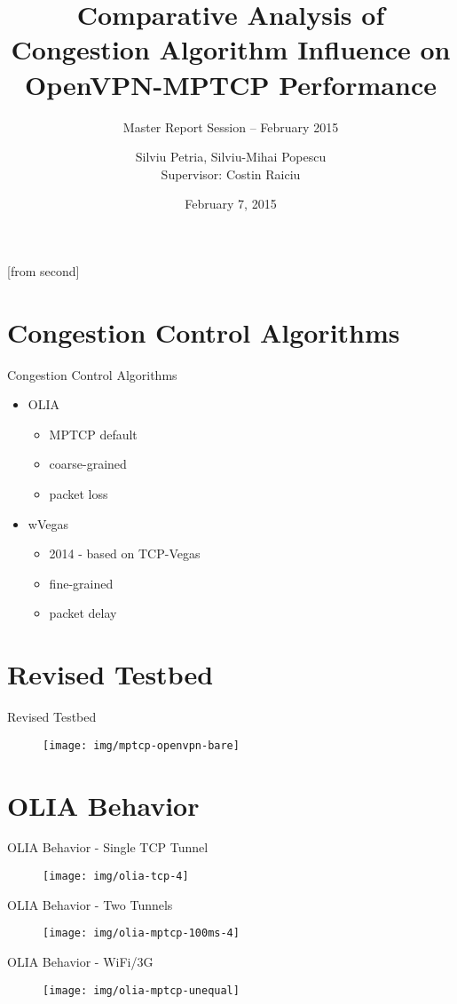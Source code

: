 \documentclass{beamer}
\title[Comparative Analysis of Congestion Algorithm
Influence on OpenVPN-MPTCP Performance]{Comparative Analysis of Congestion
Algorithm Influence on OpenVPN-MPTCP Performance}
\subtitle{Master Report Session -- February 2015}
\institute{Faculty of Automatic Control and Computers,\\
	University POLITEHNICA of Bucharest}
\author[Silviu Petria, Silviu-Mihai Popescu]{Silviu Petria, Silviu-Mihai
Popescu\\
	Supervisor: Costin Raiciu}
\date{February 7, 2015}
\begin{document}
[from second]

\frame{\titlepage}

\section{Congestion Control Algorithms}
\begin{frame}{Congestion Control Algorithms}
  \begin{itemize}
    \item OLIA
    \begin{itemize}
      \item MPTCP default
      \item coarse-grained
      \item packet loss
    \end{itemize}
    \item wVegas
    \begin{itemize}
      \item 2014 - based on TCP-Vegas
      \item fine-grained
      \item packet delay
    \end{itemize}
  \end{itemize}
\end{frame}

\section{Revised Testbed}
\begin{frame}{Revised Testbed}
  \begin{figure}
    \texttt{[image: img/mptcp-openvpn-bare]}
  \end{figure}
\end{frame}

\section{OLIA Behavior}
\begin{frame}{OLIA Behavior - Single TCP Tunnel}
  \begin{figure}
    \texttt{[image: img/olia-tcp-4]}
  \end{figure}
\end{frame}
\begin{frame}{OLIA Behavior - Two Tunnels}
  \begin{figure}
    \texttt{[image: img/olia-mptcp-100ms-4]}
  \end{figure}
\end{frame}
\begin{frame}{OLIA Behavior - WiFi/3G}
  \begin{figure}
    \texttt{[image: img/olia-mptcp-unequal]}
  \end{figure}
\end{frame}
\end{document}

